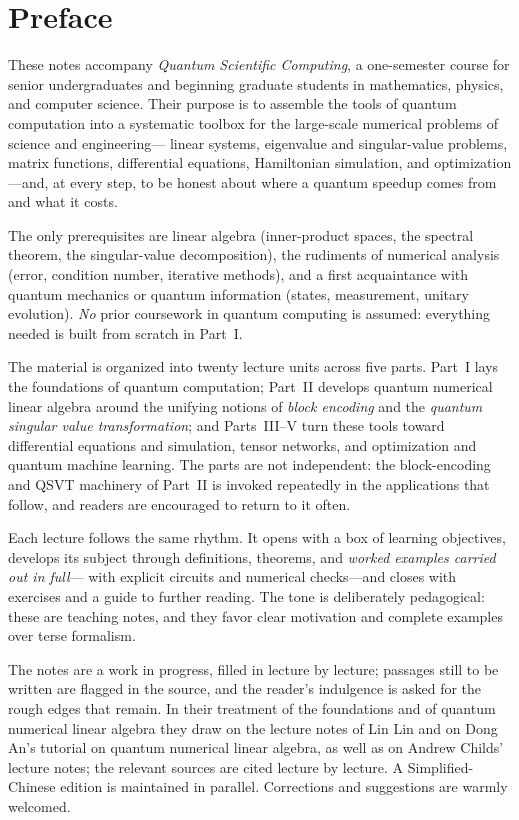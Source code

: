 \chapter*{Preface}

These notes accompany \emph{Quantum Scientific Computing}, a one-semester course for
senior undergraduates and beginning graduate students in mathematics, physics, and
computer science. Their purpose is to assemble the tools of quantum computation into a
systematic toolbox for the large-scale numerical problems of science and engineering---
linear systems, eigenvalue and singular-value problems, matrix functions, differential
equations, Hamiltonian simulation, and optimization---and, at every step, to be honest
about where a quantum speedup comes from and what it costs.

The only prerequisites are linear algebra (inner-product spaces, the spectral theorem,
the singular-value decomposition), the rudiments of numerical analysis (error, condition
number, iterative methods), and a first acquaintance with quantum mechanics or quantum
information (states, measurement, unitary evolution). \emph{No} prior coursework in
quantum computing is assumed: everything needed is built from scratch in Part~I.

The material is organized into twenty lecture units across five parts. Part~I lays the
foundations of quantum computation; Part~II develops quantum numerical linear algebra
around the unifying notions of \emph{block encoding} and the \emph{quantum singular value
transformation}; and Parts~III--V turn these tools toward differential equations and
simulation, tensor networks, and optimization and quantum machine learning. The parts are
not independent: the block-encoding and QSVT machinery of Part~II is invoked repeatedly in
the applications that follow, and readers are encouraged to return to it often.

Each lecture follows the same rhythm. It opens with a box of learning objectives, develops
its subject through definitions, theorems, and \emph{worked examples carried out in full}---
with explicit circuits and numerical checks---and closes with exercises and a guide to
further reading. The tone is deliberately pedagogical: these are teaching notes, and they
favor clear motivation and complete examples over terse formalism.

The notes are a work in progress, filled in lecture by lecture; passages still to be
written are flagged in the source, and the reader's indulgence is asked for the rough
edges that remain. In their treatment of the foundations and of quantum numerical linear
algebra they draw on the lecture notes of Lin Lin and on Dong An's tutorial on quantum
numerical linear algebra, as well as on Andrew Childs' lecture notes; the relevant sources
are cited lecture by lecture. A Simplified-Chinese edition is maintained in parallel.
Corrections and suggestions are warmly welcomed.
